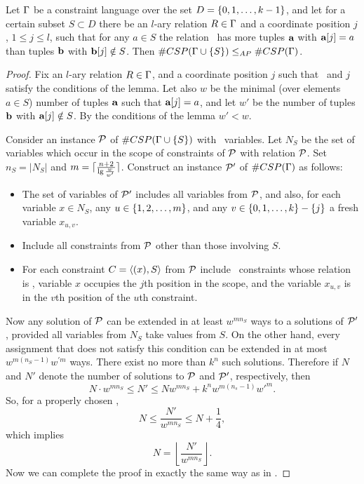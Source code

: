 \begin{lemma}\label{lem:pinning}
Let \(\Gamma\) be a constraint language over the set \(D=\{{0,1,\dotsc,k-1}\}\)\@,
and let for a certain subset \(S \subset D\) 
there be an \(l\)-ary relation \(R \in \Gamma\) and a coordinate position \(j\),
\(1 \le j \le l\), such that for any \(a\in S\) the relation \mR\ has more tuples
\(\textbf{a}\) with \(\textbf{a}[j]=a\) than tuples \(\textbf{b}\) with
\(\textbf{b}[j] \notin S\)\@. Then \(\#CSP(\Gamma \cup \{{S}\}) \le_{AP} \#CSP(\Gamma)\)\@.
\end{lemma}

\begin{proof}
Fix an \(l\)-ary relation \(R \in \Gamma\)\@, and 
a coordinate position \(j\) such that \mR\ and \(j\) satisfy the conditions of the lemma.
Let also \(w\) be the minimal (over elements \(a\in S\)) number of tuples \(\textbf{a}\)
such that \(\textbf{a}[j]=a\), and let \(w'\) be the number of tuples \(\textbf{b}\) with
\(\textbf{a}[j] \notin S\). By the conditions of the lemma \(w'<w\)\@.

Consider an instance \(\mathcal{P}\) of \(\#CSP(\Gamma \cup \{{S}\})\)
with \mn\ variables. Let \(N_S\) be the set of
variables which occur in the scope of constraints of \(\mathcal{P}\) with relation \(\mathcal{P}\)\@. 
Set \(n_S = |N_S|\) and \(m = \lceil\frac{n+2}{\lg{\frac{w}{w'}}}\rceil\)\@.
Construct an instance \(\mathcal{P}'\) of \(\#CSP(\Gamma)\) as follows:
\begin{itemize}
\item
The set of variables of \(\mathcal{P}'\) includes all variables from \(\mathcal{P}\),
and also, for each variable \(x \in N_S\), any \(u \in \{{{1,2,\dotsc,m}}\}\), and any
\(v\in\{{0,1,\dotsc,k}\}-\{j\}\) a fresh variable \(x_{u,v}\)\@. 
\item 
Include all constraints from \(\mathcal{P}\) other than those involving \(S\)\@. 
\item
For each constraint \(C=\langle (x),S \rangle\) from \(\mathcal{P}\) include \mm\ constraints whose
relation is \mR, variable \(x\) occupies the \(j\)th position in the scope,
and the variable \(x_{u,v}\) is in the \(v\)th position of the \(u\)th constraint.
\end{itemize}

Now any solution of \(\mathcal{P}\) can be extended in at least \(w^{mn_S}\) 
ways to a solutions of \(\mathcal{P}'\)\@, provided all variables from \(N_S\)
take values from \(S\)\@. On the other hand, every assignment that does not satisfy this
condition can be extended in at most \(w^{m(n_S-1)}w^{\prime m}\) ways.
There exist no more than \(k^n\) such solutions. Therefore if \(N\) and \(N'\)
denote the number of solutions to \(\mathcal{P}\) and \(\mathcal{P}'\), respectively, then
\[N\cdot w^{mn_S} \le N' \le Nw^{mn_S} + k^nw^{m(n_s-1)}w'^m.\]
So, for a properly chosen \mm, 
\[N \le \frac{N'}{w^{mn_S}} \le N + \frac{1}{4},\]
which implies
\[N = \left\lfloor \frac{N'}{w^{mn_S}} \right\rfloor.\]
Now we can complete the proof in exactly the same way as in \cite{Trichotomy}.
\end{proof}

